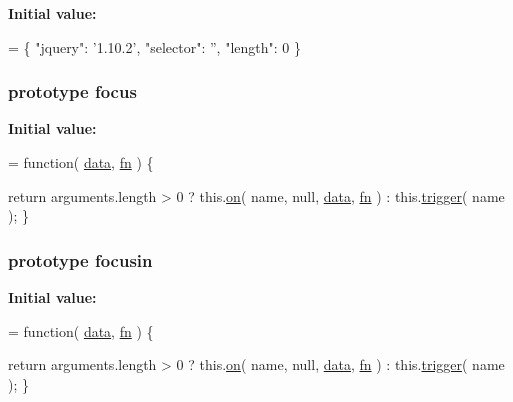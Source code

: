 {\bfseries Initial value\-:}
\begin{DoxyCode}
= \{ \textcolor{stringliteral}{"jquery"}: \textcolor{stringliteral}{'1.10.2'},
\textcolor{stringliteral}{"selector"}: \textcolor{stringliteral}{''},
\textcolor{stringliteral}{"length"}: 0 \}
\end{DoxyCode}
\hypertarget{jquery-1_810_82-vsdoc_8js_a2bab6fb1fd05f2802566c86887bdc7a2}{
\subsubsection[{focus}]{ {\bf prototype} focus}}\label{jquery-1_810_82-vsdoc_8js_a2bab6fb1fd05f2802566c86887bdc7a2}
{\bfseries Initial value\-:}
\begin{DoxyCode}
= \textcolor{keyword}{function}( \hyperlink{jquery-1_810_82-vsdoc_8js_a609407b3456fdc3c5671a9fc4a226ff7}{data}, \hyperlink{jquery-1_810_82-vsdoc_8js_acef6bdaf6b9b20fdcca1ea86f0902c3b}{fn} ) \{


        \textcolor{keywordflow}{return} arguments.length > 0 ?
            this.\hyperlink{jquery-1_810_82-vsdoc_8js_ae453b412b883f60220d73468ef6c6dbc}{on}( name, null, \hyperlink{jquery-1_810_82-vsdoc_8js_a609407b3456fdc3c5671a9fc4a226ff7}{data}, \hyperlink{jquery-1_810_82-vsdoc_8js_acef6bdaf6b9b20fdcca1ea86f0902c3b}{fn} ) :
            this.\hyperlink{jquery-1_810_82-vsdoc_8js_a2388c4114d5e3e4eab020f973641519c}{trigger}( name );
    \}
\end{DoxyCode}
\hypertarget{jquery-1_810_82-vsdoc_8js_a332119e7a3f7f91d04142c0b0ef4d719}{
\subsubsection[{focusin}]{ {\bf prototype} focusin}}\label{jquery-1_810_82-vsdoc_8js_a332119e7a3f7f91d04142c0b0ef4d719}
{\bfseries Initial value\-:}
\begin{DoxyCode}
= \textcolor{keyword}{function}( \hyperlink{jquery-1_810_82-vsdoc_8js_a609407b3456fdc3c5671a9fc4a226ff7}{data}, \hyperlink{jquery-1_810_82-vsdoc_8js_acef6bdaf6b9b20fdcca1ea86f0902c3b}{fn} ) \{


        \textcolor{keywordflow}{return} arguments.length > 0 ?
            this.\hyperlink{jquery-1_810_82-vsdoc_8js_ae453b412b883f60220d73468ef6c6dbc}{on}( name, null, \hyperlink{jquery-1_810_82-vsdoc_8js_a609407b3456fdc3c5671a9fc4a226ff7}{data}, \hyperlink{jquery-1_810_82-vsdoc_8js_acef6bdaf6b9b20fdcca1ea86f0902c3b}{fn} ) :
            this.\hyperlink{jquery-1_810_82-vsdoc_8js_a2388c4114d5e3e4eab020f973641519c}{trigger}( name );
    \}
\end{DoxyCode}
